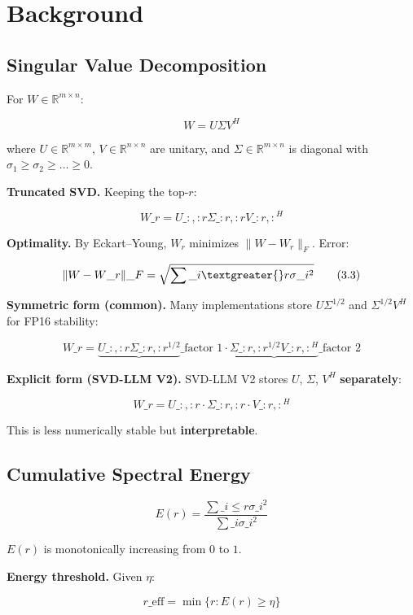 
\section{Background}

\subsection{Singular Value Decomposition}

For $W \in \mathbb{R}^{m \times n}$:

\[
W = U \Sigma V^H
\tag{3.1}
\]

where $U \in \mathbb{R}^{m \times m}$, $V \in \mathbb{R}^{n \times n}$ are 
unitary, and $\Sigma \in \mathbb{R}^{m \times n}$ is diagonal with 
$\sigma_1 \geq \sigma_2 \geq \dots \geq 0$.

\textbf{Truncated SVD.} Keeping the top-$r$:

\[
W\_r = U\_{:, :r} \Sigma\_{:r, :r} V\_{:r, :}^H
\tag{3.2}
\]

\textbf{Optimality.} By Eckart--Young, $W_r$ minimizes $\|W - W_r\|_F$. Error:

\[
\|W - W\_r\|\_F = \sqrt{\sum\_{i \textgreater{} r} \sigma\_i^2}
\tag{3.3}
\]

\textbf{Symmetric form (common).} Many implementations store $U\Sigma^{1/2}$ and 
$\Sigma^{1/2}V^H$ for FP16 stability:

\[
W\_r = \underbrace{U\_{:, :r}\Sigma\_{:r, :r}^{1/2}}\_{\text{factor 1}} \cdot \underbrace{\Sigma\_{:r, :r}^{1/2}V\_{:r, :}^H}\_{\text{factor 2}}
\tag{3.4}
\]

\textbf{Explicit form (SVD-LLM V2).} SVD-LLM V2 stores $U$, $\Sigma$, $V^H$ 
\textbf{separately}:

\[
W\_r = U\_{:, :r} \cdot \Sigma\_{:r, :r} \cdot V\_{:r, :}^H
\tag{3.5}
\]

This is less numerically stable but \textbf{interpretable}.

\subsection{Cumulative Spectral Energy}

\[
E(r) = \frac{\sum\_{i \leq r} \sigma\_i^2}{\sum\_i \sigma\_i^2}
\tag{3.6}
\]

$E(r)$ is monotonically increasing from $0$ to $1$.

\textbf{Energy threshold.} Given $\eta$:

\[
r\_\text{eff} = \min\{r : E(r) \geq \eta\}
\tag{3.7}
\]

